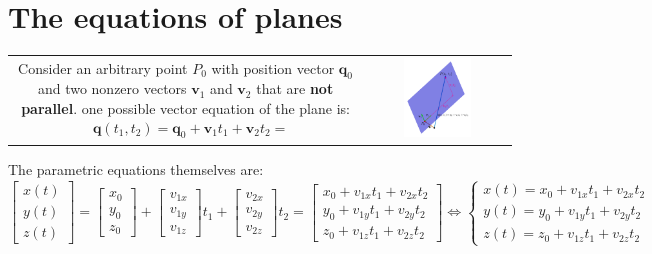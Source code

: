 \documentclass{article}
\begin{document}
\section*{The equations of planes}

\begin{tabular}{cc}
\parbox{0.5\textwidth}{
Consider an arbitrary point \(P_0\) with position vector \(\mathbf{q}_0\) and two nonzero vectors \(\mathbf{v}_1\) and \(\mathbf{v}_2\) that are {\bf not parallel}.
one possible vector equation of the plane is:
\begin{align*}
& \mathbf{q}(t_1, t_2) = \mathbf{q}_0 + \mathbf{v}_1 t_1 + \mathbf{v}_2 t_2 = 
\end{align*}
} & \parbox{0.5\textwidth}{
\includegraphics[width = 0.5\textwidth]{vector_equation_plane}
}
\end{tabular}
The parametric equations themselves are:
\[\begin{bmatrix} x(t) \\ y(t) \\ z(t) \end{bmatrix} = \begin{bmatrix} x_0 \\ y_0 \\ z_0 \end{bmatrix} + \begin{bmatrix} v_{1x} \\ v_{1y} \\ v_{1z} \end{bmatrix}t_1 + \begin{bmatrix} v_{2x} \\ v_{2y} \\ v_{2z} \end{bmatrix}t_2 = \begin{bmatrix} x_0 + v_{1x} t_1 + v_{2x} t_2 \\ y_0 + v_{1y} t_1 + v_{2y} t_2 \\ z_0 + v_{1z} t_1 + v_{2z} t_2 \end{bmatrix}  
\iff \left\{\begin{array}{c} x(t) = x_0 + v_{1x} t_1 + v_{2x} t_2 \\ y(t) = y_0 + v_{1y} t_1 + v_{2y} t_2 \\ z(t) = z_0 + v_{1z} t_1 + v_{2z} t_2 \end{array}\right.\]
\end{document}
